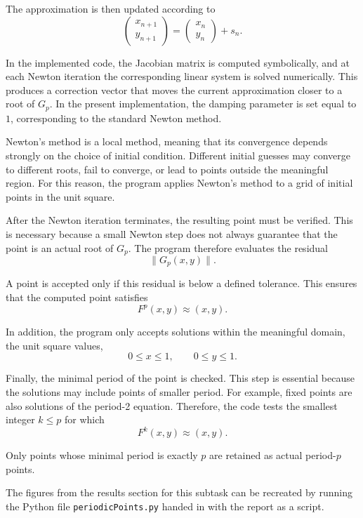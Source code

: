 The approximation is then updated according to
\[
\begin{pmatrix}
x_{n+1} \\
y_{n+1}
\end{pmatrix}
=
\begin{pmatrix}
x_n \\
y_n
\end{pmatrix}
+s_n.
\]

In the implemented code, the Jacobian matrix is computed symbolically, and at each Newton iteration the corresponding linear system is solved numerically. This produces a correction vector that moves the current approximation closer to a root of \(G_p\). In the present implementation, the damping parameter is set equal to \(1\), corresponding to the standard Newton method.


Newton's method is a local method, meaning that its convergence depends strongly on the choice of initial condition. Different initial guesses may converge to different roots, fail to converge, or lead to points outside the meaningful region. For this reason, the program applies Newton's method to a grid of initial points in the unit square.




After the Newton iteration terminates, the resulting point must be verified. This is necessary because a small Newton step does not always guarantee that the point is an actual root of \(G_p\). The program therefore evaluates the residual
\[
\|G_p(x,y)\|.
\]

A point is accepted only if this residual is below a defined tolerance. This ensures that the computed point satisfies
\[
F^p(x,y)\approx (x,y).
\]



In addition, the program only accepts solutions within the meaningful domain, the unit square values,
\[
0\leq x\leq 1,
\qquad
0\leq y\leq 1.
\]

Finally, the minimal period of the point is checked. This step is essential because the solutions may include points of smaller period. For example, fixed points are also solutions of the period-2 equation. Therefore, the code tests the smallest integer \(k\leq p\) for which
\[
F^k(x,y)\approx (x,y).
\]

Only points whose minimal period is exactly \(p\) are retained as actual period-\(p\) points.

The figures from the results section for this subtask can be recreated by running the Python file \texttt{periodicPoints.py} handed in with the report as a script.
